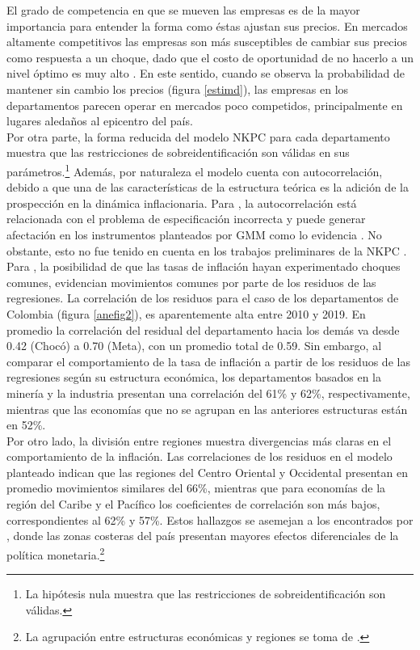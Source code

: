 El grado de competencia en que se mueven las empresas es de la mayor importancia para entender la forma como éstas ajustan sus precios. En mercados altamente competitivos las empresas son más susceptibles de cambiar sus precios como respuesta a un choque, dado que el costo de oportunidad de no hacerlo a un nivel óptimo es muy alto \citep{misas2009formacion}. En este sentido, cuando se observa la probabilidad de mantener sin cambio los precios (figura \ref{estimd}), las empresas en los departamentos parecen operar en mercados poco competidos, principalmente en lugares aledaños al epicentro del país.\\
	
Por otra parte, la forma reducida del modelo NKPC para cada departamento muestra que las restricciones de sobreidentificación son válidas  en sus parámetros.\footnote{La hipótesis nula muestra  que las restricciones de sobreidentificación son válidas.} Además,  por naturaleza el modelo cuenta con autocorrelación, debido a que una de las características de la estructura teórica es la adición de la prospección en la dinámica inflacionaria. Para \cite{baardsen2004econometric}, la autocorrelación está relacionada con el problema de especificación incorrecta y puede generar afectación en los instrumentos planteados por GMM como lo evidencia \cite{zhang2009observed}. No obstante, esto no fue tenido en cuenta en los trabajos preliminares de la NKPC \citep{gali1999inflation,gali2001european,gali2005monetary}.\\

Para \cite{mehrotra2010modelling}, la posibilidad de que las tasas de inflación hayan experimentado choques comunes, evidencian movimientos comunes por parte de los residuos de las regresiones. La correlación de los residuos para el caso de los departamentos de Colombia (figura  \ref{anefig2}), es aparentemente alta entre 2010 y 2019. En promedio la correlación del residual del departamento hacia los demás va desde 0.42 (Chocó) a 0.70 (Meta), con un promedio total de 0.59. Sin embargo, al comparar el comportamiento de la tasa de inflación a partir de  los residuos de las regresiones según su estructura económica, los departamentos basados en la minería y  la industria presentan una correlación del 61\% y 62\%, respectivamente, mientras que las economías que no se agrupan en las anteriores estructuras están en 52\%. \\

Por otro lado, la división entre regiones muestra divergencias más claras en el comportamiento de la inflación. Las correlaciones de los residuos en el modelo planteado indican que las regiones del Centro Oriental y Occidental presentan en promedio movimientos similares del 66\%, mientras que para economías de la región del Caribe y el Pacífico los coeficientes de correlación son más bajos, correspondientes al 62\% y 57\%. Estos hallazgos se asemejan a los encontrados por \cite{quintero2019impactos}, donde las zonas costeras del país presentan mayores efectos diferenciales de la política monetaria.\footnote{La agrupación entre estructuras económicas y regiones se toma de \cite{quintero2019impactos}.} \\

